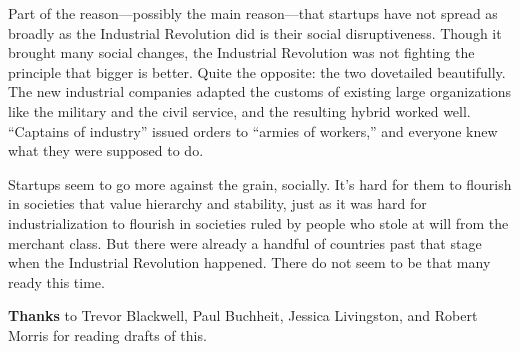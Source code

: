 Part of the reason---possibly the main reason---that startups have not
spread as broadly as the Industrial Revolution did is their social
disruptiveness. Though it brought many social changes, the Industrial
Revolution was not fighting the principle that bigger is better. Quite
the opposite: the two dovetailed beautifully. The new industrial
companies adapted the customs of existing large organizations like the
military and the civil service, and the resulting hybrid worked well.
``Captains of industry'' issued orders to ``armies of workers,'' and
everyone knew what they were supposed to do.

Startups seem to go more against the grain, socially. It's hard for them
to flourish in societies that value hierarchy and stability, just as it
was hard for industrialization to flourish in societies ruled by people
who stole at will from the merchant class. But there were already a
handful of countries past that stage when the Industrial Revolution
happened. There do not seem to be that many ready this time.


\textbf{Thanks} to Trevor Blackwell, Paul Buchheit, Jessica Livingston,
and Robert Morris for reading drafts of this.